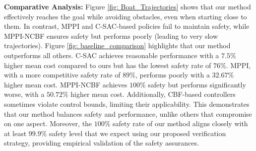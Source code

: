 \textbf{Comparative Analysis:} Figure \ref{fig: Boat_Trajectories} shows that our method effectively reaches the goal while avoiding obstacles, even when starting close to them. In contrast, MPPI and C-SAC-based policies fail to maintain safety, while MPPI-NCBF ensures safety but performs poorly (leading to very slow trajectories). Figure \ref{fig: baseline_comparison} highlights that our method outperforms all others. C-SAC achieves reasonable performance with a $7.5\%$ higher mean cost compared to ours but has the lowest safety rate of $76\%$. MPPI, with a more competitive safety rate of $89\%$, performs poorly with a $32.67\%$ higher mean cost. MPPI-NCBF achieves $100\%$ safety but performs significantly worse, with a $50.72\%$ higher mean cost. Additionally, CBF-based controllers sometimes violate control bounds, limiting their applicability. This demonstrates that our method balances safety and performance, unlike others that compromise on one aspect. Moreover, the $100\%$ safety rate of our method aligns closely with at least $99.9\%$ safety level that we expect using our proposed verification strategy, providing empirical validation of the safety assurances.

\vspace{-0.5em}
